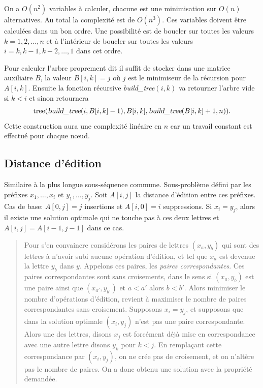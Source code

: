 \documentclass[12pt]{article}
\begin{document}
On a $O(n^2)$ variables à calculer, chacune est une minimisation sur $O(n)$ alternatives. Au total la complexité est de $O(n^3)$.
Ces variables doivent être calculées dans un bon ordre. Une possibilité est de boucler sur toutes les valeurs $k=1,2,\ldots, n$ et à l'intérieur de boucler sur toutes les valeurs $i=k,k-1, k-2, \ldots, 1$ dans cet ordre.

Pour calculer l'arbre proprement dit il suffit de stocker dans une matrice auxiliaire $B$, la valeur $B[i,k]=j$ où $j$ est le minimiseur de la récursion pour $A[i,k]$.  Ensuite la fonction récursive \textsl{build\_tree}$(i,k)$ va retourner l'arbre vide si $k<i$ et sinon retournera 
\[
\textrm{tree}(\textsl{build\_tree}(i,B[i,k]-1), B[i,k], \textsl{build\_tree}(B[i,k]+1,n)).
\]
Cette construction aura une complexité linéaire en $n$ car un travail constant est effectué pour chaque nœud.


\subsection{Distance d'édition}

Similaire à la plus longue sous-séquence commune.
Sous-problème défini par les préfixes $x_1,\ldots,x_i$ et $y_1,\ldots,y_j$.
Soit $A[i,j]$ la distance d'édition entre ces préfixes. 
Cas de base: $A[0,j]=j$ insertions et $A[i,0]=i$ suppressions.
Si $x_i=y_j$, alors il existe une solution optimale qui ne touche pas à ces deux lettres et $A[i,j]= A[i-1,j-1]$ dans ce cas.

\begin{quote} Pour s'en convaincre considérons les paires de lettres
$(x_a,y_b)$ qui sont des lettres à n'avoir subi aucune opération d'édition, et
tel que $x_a$ est devenue la lettre $y_b$ dans $y$.  Appelons ces paires, les
\emph{paires correspondantes}.  Ces paires correspondantes sont sans
croisements, dans le sens si $(x_a,y_b)$ est une paire ainsi que
$(x_{a'},y_{b'})$ et $a<a'$ alors $b<b'$.  Alors minimiser le nombre
d'opérations d'édition, revient à maximiser le nombre de paires
correspondantes sans croisement.  Supposons $x_i=y_j$, et supposons que dans
la solution optimale $(x_i,y_j)$ n'est pas une paire correspondante. Alors une
des lettres, disons $x_j$ est forcément déjà mise en correspondance avec une autre
lettre disons $y_k$ pour $k<j$.  En remplaçant cette correspondance par
$(x_i,y_j)$, on ne crée pas de croisement, et on n'altère pas le nombre de
paires.  On a donc obtenu une solution avec la propriété demandée. \end{quote}
\end{document}
